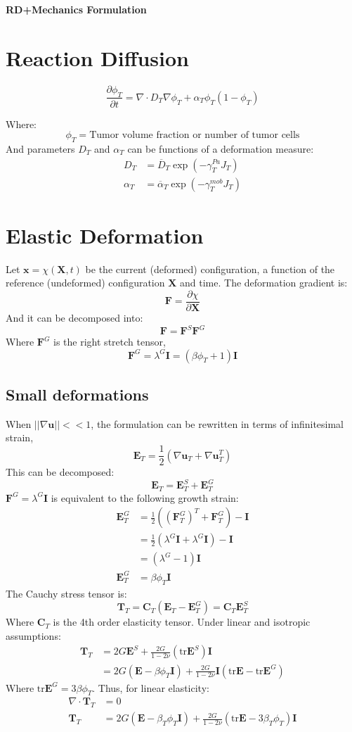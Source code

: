 \documentclass[12pt]{report}
\begin{document}
\begin{center}
\LARGE \bf RD+Mechanics Formulation
\end{center}

\section*{Reaction Diffusion}
\[ \frac{\partial\phi_T}{\partial t} = \nabla\cdot D_T \nabla \phi_T + \alpha_T\phi_T(1-\phi_T)\]

Where: 
\[ \phi_T = \textrm{Tumor volume fraction or number of tumor cells} \]
And parameters $D_T$ and $\alpha_T$ can be functions of a deformation measure:
\begin{align*}
D_T &= \overline{D}_T\exp(-\gamma_T^{Pa}J_T) \\
\alpha_T &= \overline{\alpha}_T\exp(-\gamma_T^{mob}J_T)
\end{align*}

\section*{Elastic Deformation}
Let $\bm{x} = \chi(\bm{X},t)$ be the current (deformed) configuration, a function of the reference (undeformed) configuration $\bm{X}$ and time. The deformation gradient is:
\[ \bm{F} = \frac{\partial \chi}{\partial \bm{X}} \]
And it can be decomposed into:
\[ \bm{F} = \bm{F}^S\bm{F}^G \]
Where $\bm{F}^G$ is the right stretch tensor, 
\[ \bm{F}^G = \lambda^G\bm{I} = (\beta\phi_T+1)\bm{I} \]

\subsection*{Small deformations}
When $||\nabla\bm{u}|| << 1$, the formulation can be rewritten in terms of infinitesimal strain,
\[ \bm{E}_T = \frac{1}{2}(\nabla\bm{u}_T+\nabla\bm{u}_T^T) \]
This can be decomposed:
\[ \bm{E}_T = \bm{E}_T^S+\bm{E}_T^G \]
$\bm{F}^G=\lambda^G\bm{I}$ is equivalent to the following growth strain:
\begin{align*}
\bm{E}_T^G &= \frac{1}{2}((\bm{F}_T^G)^T+\bm{F}_T^G)-\bm{I} \\
&= \frac{1}{2}(\lambda^G\bm{I}+\lambda^G\bm{I})-\bm{I} \\
&= (\lambda^G-1)\bm{I}  \\
\bm{E}_T^G &= \beta\phi_T\bm{I} 
\end{align*}
The Cauchy stress tensor is:
\[ \bm{T}_T = \bm{C}_T(\bm{E}_T-\bm{E}_T^G) = \bm{C}_T\bm{E}_T^S \]
Where $\bm{C}_T$ is the 4th order elasticity tensor. Under linear and isotropic assumptions:
\begin{align*}
\bm{T}_T &= 2G\bm{E}^S+\frac{2G}{1-2\nu}(\textrm{tr}\bm{E}^S)\bm{I} \\
&=2G(\bm{E}-\beta\phi_T\bm{I})+\frac{2G}{1-2\nu}\bm{I}(\textrm{tr}\bm{E}-\textrm{tr}\bm{E}^G) 
\end{align*}
Where $\textrm{tr}\bm{E}^G = 3\beta\phi_T$. Thus, for linear elasticity:
\begin{align*}
\nabla\cdot\bm{T}_T &= 0 \\
\bm{T}_T &= 2G(\bm{E}-\beta_T\phi_T\bm{I})+\frac{2G}{1-2\nu}(\textrm{tr}\bm{E}-3\beta_T\phi_T)\bm{I}
\end{align*}
\end{document}
